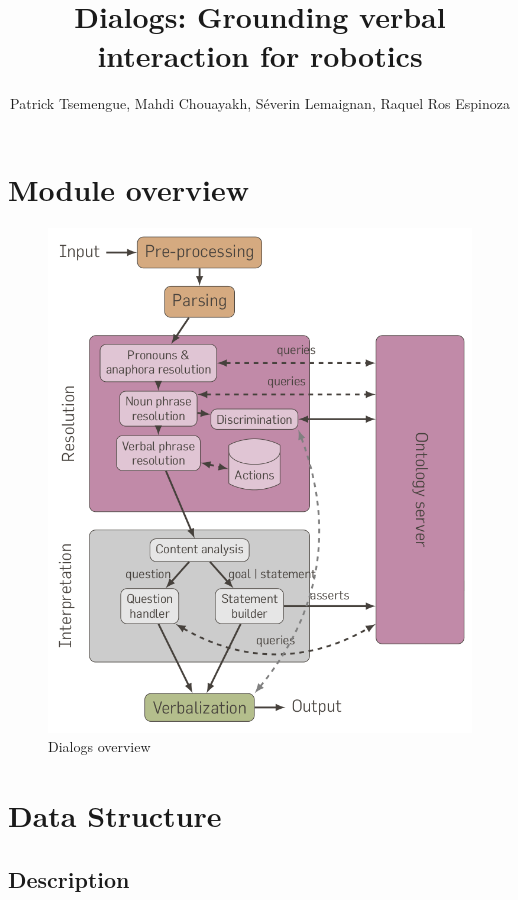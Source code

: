 \documentclass[twoside,a4paper,10pt]{report}
\title{ Dialogs: Grounding verbal interaction for robotics}
\author{Patrick Tsemengue, Mahdi Chouayakh, Séverin Lemaignan, Raquel Ros Espinoza}
\begin{document}


\sffamily
\allsectionsfont{\sffamily}

\thispagestyle{empty}
\maketitle
\thispagestyle{empty}
\cleardoublepage
\tableofcontents
\newpage
\thispagestyle{plain}
\cleardoublepage
\newpage



\chapter{Module overview}
\label{f0e926ab940662bebfe368ba24960a2d}%

\begin{figure}[h]
\centering
\includegraphics[width=0.7\linewidth]{dialogs_module_simple.png}
\caption{Dialogs overview}
\end{figure}



\chapter{Data Structure}
\label{c8f6850ec2ec3fb32f203c1f4e3c2fd2}%

\section{Description}
\label{67daf92c833c41c95db874e18fcb2786}%
\end{document}

